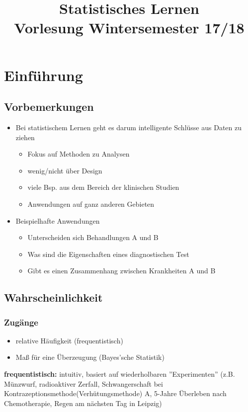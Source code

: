 \documentclass[10pt]{report}
\title{Statistisches Lernen\\ \large{Vorlesung Wintersemester 17/18}\\
			}
\date{}
\author{}
\theoremstyle{definition}
\begin{document}
\maketitle
\tableofcontents

	\chapter{Einführung}
	\section{Vorbemerkungen}
	\begin{itemize}
		\item Bei statistischem Lernen geht es darum intelligente Schlüsse aus Daten zu ziehen
		\begin{itemize}
			\item Fokus auf Methoden zu Analysen
			\item wenig/nicht über Design
			\item viele Bsp. aus dem Bereich der klinischen Studien
			\item Anwendungen auf ganz anderen Gebieten
		\end{itemize}
	\item Beispielhafte Anwendungen
	\begin{itemize}
		\item Unterscheiden sich Behandlungen A und B
		\item Was sind die Eigenschaften eines diagnostischen Test
		\item Gibt es einen Zusammenhang zwischen Krankheiten A und B
	\end{itemize}
	\end{itemize}
\section{Wahrscheinlichkeit}
\subsection{Zugänge}
\begin{itemize}
	\item relative Häufigkeit (frequentistisch)
	\item Maß für eine Überzeugung (Bayes'sche Statistik)
\end{itemize}
\textbf{frequentistisch:} intuitiv, basiert auf wiederholbaren ''Experimenten'' (z.B. Münzwurf, radioaktiver Zerfall, Schwangerschaft bei Kontrazeptionsmethode(Verhütungsmethode) A, 5-Jahre Überleben nach Chemotherapie, Regen am nächsten Tag in Leipzig)
\end{document}

